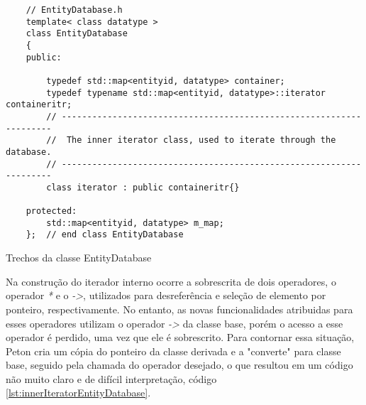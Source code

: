 \begin{listing}[!ht]
    \begin{verbatim}
    // EntityDatabase.h
    template< class datatype >
    class EntityDatabase
    {
    public:

        typedef std::map<entityid, datatype> container;
        typedef typename std::map<entityid, datatype>::iterator containeritr;
        // --------------------------------------------------------------------
        //  The inner iterator class, used to iterate through the database.
        // --------------------------------------------------------------------
        class iterator : public containeritr{}

    protected:
        std::map<entityid, datatype> m_map;
    };  // end class EntityDatabase
    \end{verbatim}
\caption{Trechos da classe EntityDatabase}
\label{lst:entityDatabase}
\end{listing}

Na construção do iterador interno ocorre a sobrescrita de dois operadores, o operador 
\textit{*} e o \textit{->}, utilizados para desreferência e seleção de elemento por ponteiro, 
respectivamente. No entanto, as novas funcionalidades atribuidas para esses operadores utilizam 
o operador \textit{->} da classe base, porém o acesso a esse operador é perdido, uma vez que ele 
é sobrescrito. Para contornar essa situação, Peton cria um cópia do ponteiro da classe derivada e a 
"converte" para classe base, seguido pela chamada do operador desejado, o que resultou em um 
código não muito claro e de difícil interpretação, código \ref{lst:innerIteratorEntityDatabase}.

